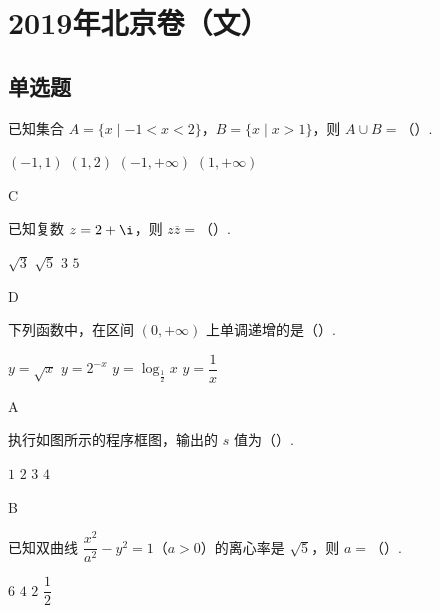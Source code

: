 \chapter{2019年北京卷（文）}

\section{单选题}

\begin{problem}
已知集合 \(A=\{x\mid -1<x<2\}\)，\(B=\{x\mid x>1\}\)，则 \(A\cup B=\)（\quad）.

\choices
    {\(\left(-1,1\right)\)}
    {\(\left(1,2\right)\)}
    {\(\left(-1,+\infty\right)\)}
    {\(\left(1,+\infty\right)\)}
\end{problem}

\begin{answer}
C
\end{answer}

\begin{problem}
已知复数 \(z=2+\i\)，则 \(z\overline z=\)（\quad）.

\choices
    {\(\sqrt3\)}
    {\(\sqrt5\)}
    {\(3\)}
    {\(5\)}
\end{problem}

\begin{answer}
D
\end{answer}

\begin{problem}
下列函数中，在区间 \(\left(0,+\infty\right)\) 上单调递增的是（\quad）.

\choices
    {\(y=\sqrt{x}\)}
    {\(y=2^{-x}\)}
    {\(y=\log_{\frac12}x\)}
    {\(y=\dfrac1x\)}
\end{problem}

\begin{answer}
A
\end{answer}

\begin{problem}
执行如图所示的程序框图，输出的 \(s\) 值为（\quad）.


\choices
    {\(1\)}
    {\(2\)}
    {\(3\)}
    {\(4\)}
\end{problem}

\begin{answer}
B
\end{answer}

\begin{problem}
已知双曲线 \(\dfrac{x^2}{a^2}-y^2=1\)（\(a>0\)）的离心率是 \(\sqrt5\)，则 \(a=\)（\quad）.

\choices
    {\(6\)}
    {\(4\)}
    {\(2\)}
    {\(\dfrac12\)}
\end{problem}

